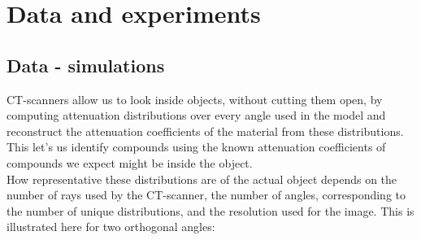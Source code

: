 \documentclass{article}
\begin{document}
\section{Data and experiments}
\subsection{Data - simulations}
CT-scanners allow us to look inside objects, without cutting them open, by computing attenuation distributions over every angle used in the model and reconstruct the attenuation coefficients of the material from these distributions. This let's us identify compounds using the known attenuation coefficients of compounds we expect might be inside the object. \\ 
How representative these distributions are of the actual object depends on the number of rays used by the CT-scanner, the number of angles, corresponding to the number of unique distributions, and the resolution used for the image. This is illustrated here for two orthogonal angles:
\end{document}
